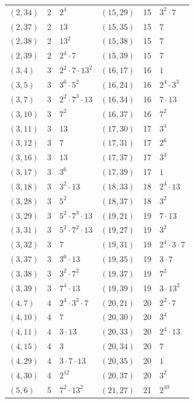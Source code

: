 \documentclass[11pt]{article}
\begin{document}
\begin{longtable}{@{}lrl@{\qquad}lrl@{}}
$(2,34)$ & 2 & $2^{4}$ & $(15,29)$ & 15 & $3^{2}\cdot 7$\\
$(2,37)$ & 2 & $13$ & $(15,35)$ & 15 & $7$\\
$(2,38)$ & 2 & $13^{2}$ & $(15,38)$ & 15 & $7$\\
$(2,39)$ & 2 & $2^{4}\cdot 7$ & $(15,39)$ & 15 & $7$\\
$(3,4)$ & 3 & $2^{2}\cdot 7\cdot 13^{2}$ & $(16,17)$ & 16 & $1$\\
$(3,5)$ & 3 & $3^{6}\cdot 5^{2}$ & $(16,24)$ & 16 & $2^{4}\cdot 3^{3}$\\
$(3,7)$ & 3 & $2^{2}\cdot 7^{3}\cdot 13$ & $(16,34)$ & 16 & $7\cdot 13$\\
$(3,10)$ & 3 & $7^{2}$ & $(16,37)$ & 16 & $7^{2}$\\
$(3,11)$ & 3 & $13$ & $(17,30)$ & 17 & $3^{4}$\\
$(3,12)$ & 3 & $7$ & $(17,31)$ & 17 & $2^{6}$\\
$(3,16)$ & 3 & $13$ & $(17,37)$ & 17 & $3^{4}$\\
$(3,17)$ & 3 & $3^{6}$ & $(17,39)$ & 17 & $1$\\
$(3,18)$ & 3 & $3^{2}\cdot 13$ & $(18,33)$ & 18 & $2^{4}\cdot 13$\\
$(3,28)$ & 3 & $5^{2}$ & $(18,37)$ & 18 & $3^{2}$\\
$(3,29)$ & 3 & $5^{2}\cdot 7^{3}\cdot 13$ & $(19,21)$ & 19 & $7\cdot 13$\\
$(3,31)$ & 3 & $5^{2}\cdot 7^{2}\cdot 13$ & $(19,27)$ & 19 & $3^{2}$\\
$(3,32)$ & 3 & $7$ & $(19,31)$ & 19 & $2^{4}\cdot 3\cdot 7$\\
$(3,37)$ & 3 & $3^{6}\cdot 13$ & $(19,35)$ & 19 & $3\cdot 7$\\
$(3,38)$ & 3 & $3^{2}\cdot 7^{2}$ & $(19,37)$ & 19 & $7^{2}$\\
$(3,39)$ & 3 & $7^{4}\cdot 13$ & $(19,39)$ & 19 & $3\cdot 13^{2}$\\
$(4,7)$ & 4 & $2^{4}\cdot 3^{3}\cdot 7$ & $(20,21)$ & 20 & $2^{2}\cdot 7$\\
$(4,10)$ & 4 & $7$ & $(20,30)$ & 20 & $3^{4}$\\
$(4,11)$ & 4 & $3\cdot 13$ & $(20,33)$ & 20 & $2^{4}\cdot 13$\\
$(4,15)$ & 4 & $3$ & $(20,34)$ & 20 & $7$\\
$(4,29)$ & 4 & $3\cdot 7\cdot 13$ & $(20,35)$ & 20 & $1$\\
$(4,30)$ & 4 & $2^{12}$ & $(20,37)$ & 20 & $3^{2}$\\
$(5,6)$ & 5 & $7^{2}\cdot 13^{2}$ & $(21,27)$ & 21 & $2^{10}$\\

\end{longtable}
\end{document}
